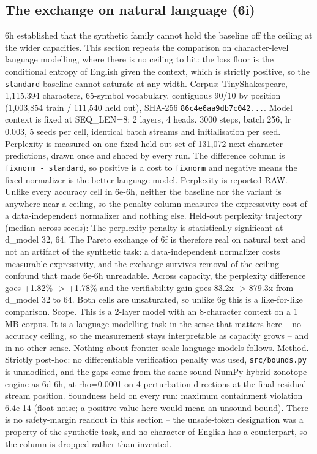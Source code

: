 \documentclass[sn-nature,pdflatex]{sn-jnl}
\begin{document}
\subsection{The exchange on natural language (6i)}
6h established that the synthetic family cannot hold the baseline off the ceiling at the wider capacities. This section repeats the comparison on character-level language modelling, where there is no ceiling to hit: the loss floor is the conditional entropy of English given the context, which is strictly positive, so the \texttt{standard} baseline cannot saturate at any width.
Corpus: TinyShakespeare, 1,115,394 characters, 65-symbol vocabulary, contiguous 90/10 by position (1,003,854 train / 111,540 held out), SHA-256 \texttt{86c4e6aa9db7c042...}. Model context is fixed at SEQ\_LEN=8; 2 layers, 4 heads. 3000 steps, batch 256, lr 0.003, 5 seeds per cell, identical batch streams and initialisation per seed. Perplexity is measured on one fixed held-out set of 131,072 next-character predictions, drawn once and shared by every run.
The difference column is \texttt{fixnorm - standard}, so positive is a cost to \texttt{fixnorm} and negative means the fixed normalizer is the better language model.
Perplexity is reported RAW. Unlike every accuracy cell in 6e-6h, neither the baseline nor the variant is anywhere near a ceiling, so the penalty column measures the expressivity cost of a data-independent normalizer and nothing else.
Held-out perplexity trajectory (median across seeds):
The perplexity penalty is statistically significant at d\_model 32, 64. The Pareto exchange of 6f is therefore real on natural text and not an artifact of the synthetic task: a data-independent normalizer costs measurable expressivity, and the exchange survives removal of the ceiling confound that made 6e-6h unreadable.
Across capacity, the perplexity difference goes +1.82\% -> +1.78\% and the verifiability gain goes 83.2x -> 879.3x from d\_model 32 to 64. Both cells are unsaturated, so unlike 6g this is a like-for-like comparison.
Scope. This is a 2-layer model with an 8-character context on a 1 MB corpus. It is a language-modelling task in the sense that matters here -- no accuracy ceiling, so the measurement stays interpretable as capacity grows -- and in no other sense. Nothing about frontier-scale language models follows.
Method. Strictly post-hoc: no differentiable verification penalty was used, \texttt{src/bounds.py} is unmodified, and the gaps come from the same sound NumPy hybrid-zonotope engine as 6d-6h, at rho=0.0001 on 4 perturbation directions at the final residual-stream position. Soundness held on every run: maximum containment violation 6.4e-14 (float noise; a positive value here would mean an unsound bound). There is no safety-margin readout in this section -- the unsafe-token designation was a property of the synthetic task, and no character of English has a counterpart, so the column is dropped rather than invented.
\end{document}
